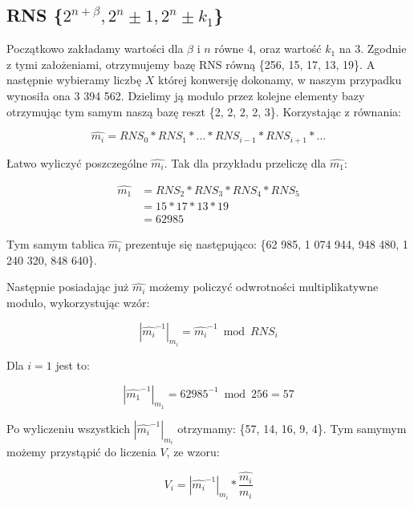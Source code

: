 \documentclass[comsoc]{IEEEtran}
\begin{document}
	\subsection{RNS \{$2^{n+\beta}, 2^n\pm1, 2^n\pm k_{1}$\}}
	
	Początkowo zakładamy wartości dla $\beta$ i $n$ równe 4, oraz wartość $k_{1}$ na 3. Zgodnie z tymi założeniami, otrzymujemy bazę RNS równą \{256, 15, 17, 13, 19\}. A następnie wybieramy liczbę $X$ której konwersję dokonamy, w naszym przypadku wynosiła ona 3 394 562. Dzielimy ją modulo przez kolejne elementy bazy otrzymując tym samym naszą bazę reszt \{2, 2, 2, 2, 3\}. Korzystając z równania:
	
	\begin{equation} \label{eq:mdaszek}
	\hat{m_{i}}=RNS_{0}*RNS_{1}*...*RNS_{i-1}*RNS_{i+1}*...
	\end{equation}
	
	Łatwo wyliczyć poszczególne $\hat{m_{i}}$. Tak dla przykładu przeliczę dla $\hat{m_{1}}$:
	
	\begin{equation} \label{eq:mdaszek1}
	\begin{aligned}
	\hat{m_{1}}{} & =RNS_{2}*RNS_{3}*RNS_{4}*RNS_{5}\\& = 15 * 17 * 13 * 19\\& = 62985
	\end{aligned}
	\end{equation}
	
	Tym samym tablica $\hat{m_{i}}$ prezentuje się następująco: \{62 985, 1 074 944, 948 480, 1 240 320, 848 640\}.
	
	Następnie posiadając już $\hat{m_{i}}$ możemy policzyć odwrotności multiplikatywne modulo, wykorzystując wzór:
	
	\begin{equation} \label{eq:multiplikat}
	|\hat{m_{i}}^{-1}|_{m_{i}} = \hat{m_{i}}^{-1} \bmod RNS_{i}
	\end{equation}
	
	Dla $i=1$ jest to:
	
	\begin{equation} \label{eq:multiplikatm1}
	|\hat{m_{1}}^{-1}|_{m_{1}} = 62985^{-1} \bmod 256 = 57
	\end{equation}
	
	Po wyliczeniu wszystkich $|\hat{m_{i}}^{-1}|_{m_{i}}$ otrzymamy: \{57, 14, 16, 9, 4\}. Tym samymym możemy przystąpić do liczenia $V$, ze wzoru:
	
	\begin{equation} \label{eq:Vogol}
	V_{i} = |\hat{m_{i}}^{-1}|_{m_{i}} * \frac{\hat{m_{i}}}{m_{i}}
	\end{equation}
	
\end{document}
